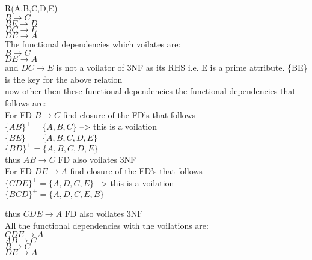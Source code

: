 
R(A,B,C,D,E)\\
$B \rightarrow C$\\
$BE \rightarrow D$\\
$DC \rightarrow E$\\
$DE \rightarrow A$\\

The functional dependencies which voilates are:\\

$B \rightarrow C$\\
$DE \rightarrow A$\\

and $DC \rightarrow E$ is not a voilator of 3NF as its RHS i.e. E is a prime attribute. \{BE\} is the key for the above relation\\

now other then these functional dependencies the functional dependencies that follows are:\\

For FD $B \rightarrow C$ find closure of the FD's that follows\\
$\{AB\}^+ = \{ A,B,C\}$  --> this is a voilation\\
$\{BE\}^+ = \{ A,B,C,D,E\}$ \\
$\{BD\}^+ = \{ A,B,C,D,E\}$ \\

thus $AB \rightarrow C$ FD also voilates 3NF \\

For FD $DE \rightarrow A$ find closure of the FD's that follows\\
$\{CDE\}^+ = \{ A,D,C,E\}$  --> this is a voilation\\
$\{BCD\}^+ = \{ A,D,C,E,B\}$

thus $CDE \rightarrow A$ FD also voilates 3NF \\


All the functional dependencies with the voilations are:\\
$CDE \rightarrow A$\\
$AB \rightarrow C$\\
$B \rightarrow C$\\
$DE \rightarrow A$\\